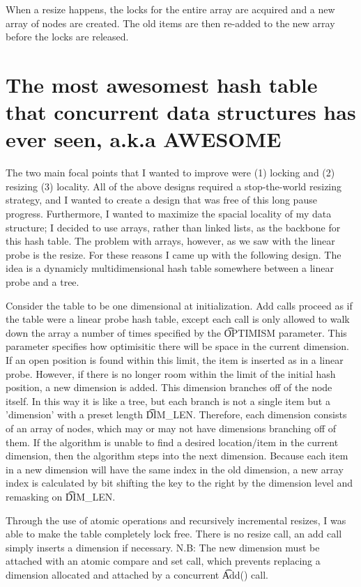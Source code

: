 When a resize happens, the locks for the entire array are acquired and
a new array of nodes are created. The old items are then re-added to
the new array before the locks are released.

\section{The most awesomest hash table that concurrent
  data structures has ever seen, a.k.a AWESOME}


The two main focal points that I wanted to improve were (1) locking
and (2) resizing (3) locality.  All of the above designs required a
stop-the-world resizing strategy, and I wanted to create a design that
was free of this long pause progress.  Furthermore, I wanted to
maximize the spacial locality of my data structure; I decided to use
arrays, rather than linked lists, as the backbone for this hash
table. The problem with arrays, however, as we saw with the linear
probe is the resize. For these reasons I came up with the following
design. The idea is a dynamicly multidimensional hash table somewhere
between a linear probe and a tree. 

Consider the table to be one dimensional at initialization. Add calls
proceed as if the table were a linear probe hash table, except each
call is only allowed to walk down the array a number of times
specified by the \t{OPTIMISM} parameter. This parameter specifies how
optimisitic there will be space in the current dimension.  If an open
position is found within this limit, the item is inserted as in a
linear probe.  However, if there is no longer room within the limit of
the initial hash position, a new dimension is added.  This dimension
branches off of the node itself. In this way it is like a tree, but
each branch is not a single item but a 'dimension' with a preset
length \t{DIM\_LEN}. Therefore, each dimension consists of an array of
nodes, which may or may not have dimensions branching off of them.  If
the algorithm is unable to find a desired location/item in the current
dimension, then the algorithm steps into the next dimension.  Because
each item in a new dimension will have the same index in the old
dimension, a new array index is calculated by bit shifting the key to
the right by the dimension level and remasking on \t{DIM\_LEN}.  

Through the use of atomic operations and recursively incremental
resizes, I was able to make the table completely lock free. There is
no resize call, an add call simply inserts a dimension if necessary.
N.B: The new dimension must be attached with an atomic compare and set
call, which prevents replacing a dimension allocated and attached by a
concurrent \t{Add()} call. 

